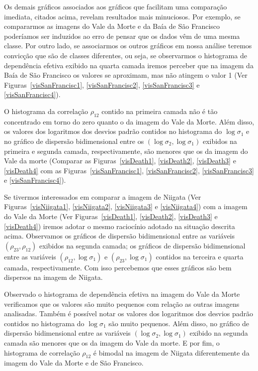 \documentclass[journal]{IEEEtran}
\begin{document}
Os demais gráficos associados aos gráficos que facilitam uma comparação imediata, citados acima, revelam resultados mais minuciosos. Por exemplo, se compararmos as imagens do Vale da Morte e da Baía de São Francisco poderíamos ser induzidos ao erro de pensar que os dados vêm de uma mesma classe. Por outro lado, se associarmos os outros gráficos em nossa análise teremos convicção que são de classes diferentes, ou seja, se observarmos o histograma de dependência efetiva exibido na quarta camada iremos perceber que na imagem da Baía de São Francisco os valores se aproximam, mas não atingem o valor 1 (Ver Figuras~\ref{visSanFrancisc1}, \ref{visSanFrancisc2}, \ref{visSanFrancisc3} e \ref{visSanFrancisc4}).

O histograma da correlação $\rho_{12}$ contido na primeira camada não é tão concentrado em torno do zero quanto o da imagem do Vale da Morte. Além disso, os valores dos logaritmos dos desvios padrão contidos no histograma do $\log\sigma_{1}$ e no gráfico de dispersão bidimensional entre os $(\log\sigma_{2},\log\sigma_{1})$ exibidos na primeira e segunda camada, respectivamente, são menores que os da imagem do Vale da morte (Comparar as Figuras~\ref{visDeath1}, \ref{visDeath2}, \ref{visDeath3} e \ref{visDeath4} com as Figuras~\ref{visSanFrancisc1}, \ref{visSanFrancisc2}, \ref{visSanFrancisc3} e \ref{visSanFrancisc4}).   

Se tivermos interessados em comparar a imagem de Niigata (Ver Figuras~\ref{visNiigata1}, \ref{visNiigata2}, \ref{visNiigata3} e \ref{visNiigata4}) com a imagem do Vale da Morte (Ver Figuras~\ref{visDeath1}, \ref{visDeath2}, \ref{visDeath3} e \ref{visDeath4}) iremos adotar o mesmo raciocínio adotado na situação descrita acima. Observamos os gráficos de dispersão bidimensional entre as variáveis $(\rho_{23}, \rho_{12})$ exibidos na segunda camada; os gráficos de dispersão bidimensional entre as variáveis $(\rho_{12},\log\sigma_{1})$ e $(\rho_{23},\log\sigma_{1})$ contidos na terceira e quarta camada, respectivamente. Com isso percebemos que esses gráficos são bem dispersos na imagem de Niigata.

Observado o histograma de dependência efetiva na imagem do Vale da Morte verificamos que os valores são muito pequenos com relação as outras imagens analisadas. Também é possível notar os valores dos logaritmos dos desvios padrão contidos no histograma do $\log\sigma_{1}$ são muito pequenos. Além disso, no gráfico de dispersão bidimensional entre as variáveis $(\log\sigma_{2},\log\sigma_{1})$ exibido na segunda camada são menores que os da imagem do Vale da morte. E por fim, o histograma de correlação $\rho_{12}$ é bimodal na imagem de Niigata diferentemente da imagem do Vale da Morte e de São Francisco.      
\end{document}
